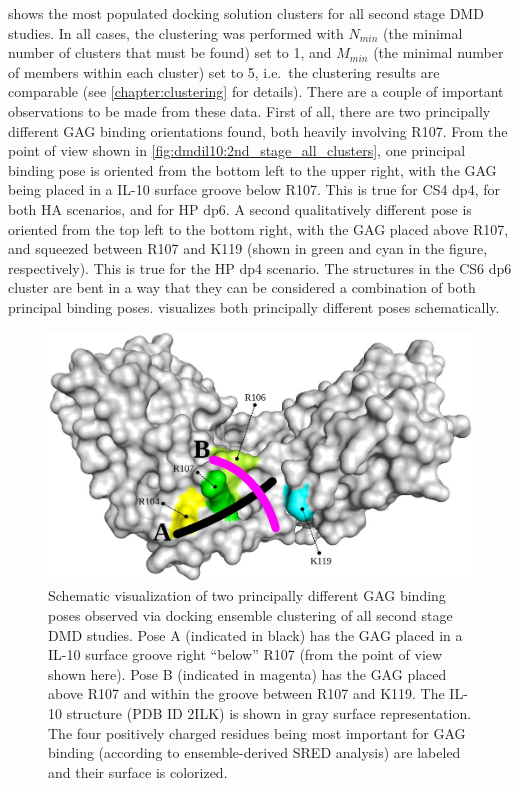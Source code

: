 shows the most populated docking
solution clusters for all second stage DMD studies. In all cases, the clustering
was performed with $N_{min}$ (the minimal number of clusters that must be found)
set to 1, and $M_{min}$ (the minimal number of members within each cluster) set
to 5, i.e.\ the clustering results are comparable (see \cref{chapter:clustering}
for details). There are a couple of important observations to be made from these
data. First of all, there are two principally different GAG binding orientations
found, both heavily involving R107. From the point of view shown in
\cref{fig:dmdil10:2nd_stage_all_clusters}, one principal binding pose is
oriented from the bottom left to the upper right, with the GAG being placed in a
IL-10 surface groove below R107. This is true for CS4 dp4, for both HA
scenarios, and for HP dp6. A second qualitatively different pose is oriented
from the top left to the bottom right, with the GAG placed above R107, and
squeezed between R107 and K119 (shown in green and cyan in the figure,
respectively). This is true for the HP dp4 scenario. The structures in the CS6
dp6 cluster are bent in a way that they can be considered a combination of both
principal binding poses.  visualizes
both principally different poses schematically.

\begin{figure}
\centering
\includegraphics[width=1.0\textwidth]{gfx/dmdil10/principal_poses_06.jpg}
\caption[]{
Schematic visualization of two principally different GAG binding poses observed
via docking ensemble clustering of all second stage DMD studies. Pose A
(indicated in black) has the GAG placed in a IL-10 surface groove right
\enquote{below} R107 (from the point of view shown here). Pose B (indicated in
magenta) has the GAG placed above R107 and within the groove between R107 and
K119. The IL-10 structure (PDB ID 2ILK) is shown in gray surface representation.
The four positively charged residues being most important for GAG binding
(according to ensemble-derived SRED analysis) are labeled and their surface is
colorized.}
\label{fig:dmdil10:2nd_stage_principal_poses}
\end{figure}

